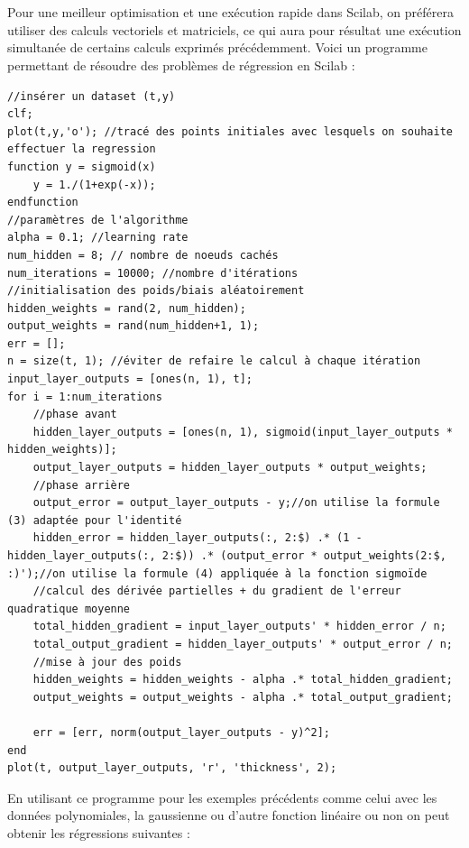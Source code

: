         \\\\Pour une meilleur optimisation et une exécution rapide dans Scilab, on préférera utiliser des calculs vectoriels et matriciels, ce qui aura pour résultat une exécution simultanée de certains calculs exprimés précédemment. Voici un programme permettant de résoudre des problèmes de régression en Scilab :
        \begin{center}
          \begin{verbatim}
//insérer un dataset (t,y)
clf;
plot(t,y,'o'); //tracé des points initiales avec lesquels on souhaite effectuer la regression 
function y = sigmoid(x)
    y = 1./(1+exp(-x));
endfunction
//paramètres de l'algorithme
alpha = 0.1; //learning rate
num_hidden = 8; // nombre de noeuds cachés 
num_iterations = 10000; //nombre d'itérations
//initialisation des poids/biais aléatoirement
hidden_weights = rand(2, num_hidden);
output_weights = rand(num_hidden+1, 1);
err = [];
n = size(t, 1); //éviter de refaire le calcul à chaque itération
input_layer_outputs = [ones(n, 1), t];
for i = 1:num_iterations
    //phase avant
    hidden_layer_outputs = [ones(n, 1), sigmoid(input_layer_outputs * hidden_weights)];
    output_layer_outputs = hidden_layer_outputs * output_weights;
    //phase arrière
    output_error = output_layer_outputs - y;//on utilise la formule (3) adaptée pour l'identité
    hidden_error = hidden_layer_outputs(:, 2:$) .* (1 - hidden_layer_outputs(:, 2:$)) .* (output_error * output_weights(2:$, :)');//on utilise la formule (4) appliquée à la fonction sigmoïde
    //calcul des dérivée partielles + du gradient de l'erreur quadratique moyenne
    total_hidden_gradient = input_layer_outputs' * hidden_error / n;
    total_output_gradient = hidden_layer_outputs' * output_error / n;
    //mise à jour des poids
    hidden_weights = hidden_weights - alpha .* total_hidden_gradient;
    output_weights = output_weights - alpha .* total_output_gradient;
    
    err = [err, norm(output_layer_outputs - y)^2];
end
plot(t, output_layer_outputs, 'r', 'thickness', 2);
          \end{verbatim}
                \label{lst:code_17}
         \end{center}
        En utilisant ce programme pour les exemples précédents comme celui avec les données polynomiales, la gaussienne ou d'autre fonction linéaire ou non on peut obtenir les régressions suivantes : 
